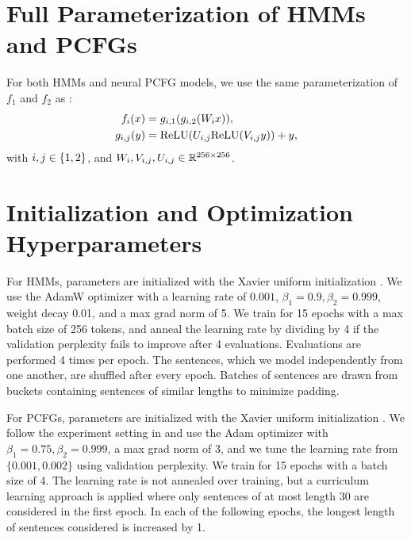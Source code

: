\documentclass{article}
\begin{document}
\section{\label{sec:mlp-param}Full Parameterization of HMMs and PCFGs}
For both HMMs and neural PCFG models, we use the same parameterization of $f_1$ and $f_2$ as \citet{kim2019cpcfg}:
\begin{equation}
\label{eqn:res}
\begin{aligned}
f_i(x) &= g_{i,1}(g_{i,2}(W_i x)),\\
g_{i,j}(y) &= \mathrm{ReLU}(U_{i,j} \mathrm{ReLU}(V_{i,j} y)) + y,
\end{aligned}
\end{equation}
with $i,j \in \left\{1,2\right\}$, and
$W_i,V_{i,j},U_{i,j} \in \mathbb{R}^{256 \times 256}$.

\section{\label{sec:opt}Initialization and Optimization Hyperparameters}
For HMMs, parameters are initialized with the Xavier uniform initialization \citep{glorot2010understanding}.
We use the AdamW \citep{adamw} optimizer with a learning rate of $0.001$, $\beta_1=0.9,\beta_2=0.999$, weight decay 0.01, and a max grad norm of 5. We train for 15 epochs with a max batch size of 256 tokens, and anneal the learning rate by dividing by 4 if the validation perplexity fails to improve after 4 evaluations. Evaluations are performed 4 times per epoch.
The sentences, which we model independently from one another, are shuffled after every epoch.
Batches of sentences are drawn from buckets containing sentences of similar lengths to minimize padding. 

For PCFGs, parameters are initialized with the Xavier uniform initialization \citep{glorot2010understanding}.
We follow the experiment setting in \citet{kim2019cpcfg} and use the Adam \citep{kingma2017adam} optimizer with $\beta_1=0.75,\beta_2=0.999$, a max grad norm of 3, and we tune the learning rate from $\{0.001, 0.002\}$ using validation perplexity. We train for 15 epochs with a batch size of 4. The learning rate is not annealed over training, but a curriculum learning approach is applied where only sentences of at most length 30 are considered in the first epoch. In each of the following epochs, the longest length of sentences considered is increased by 1.
\end{document}
